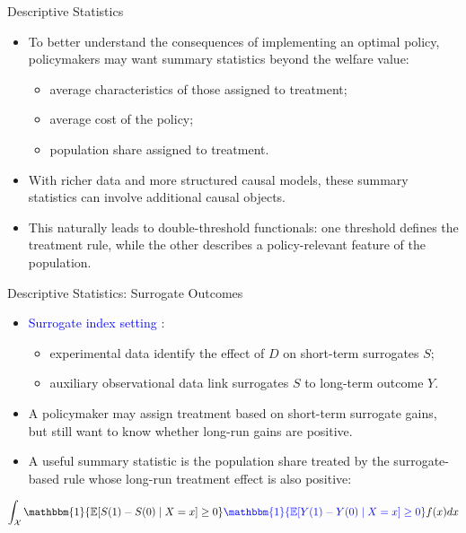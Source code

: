 \documentclass[aspectratio=169,xcolor=dvipsnames]{beamer}
\begin{document}
\begin{frame}{Descriptive Statistics}
    \begin{itemize}
        \item To better understand the consequences of implementing an optimal policy, policymakers may want summary statistics beyond the welfare value:
            \begin{itemize}
                \item[-] average characteristics of those assigned to treatment;
                \item[-] average cost of the policy;
                \item[-] population share assigned to treatment.
            \end{itemize}

        \bigskip
        \item With richer data and more structured causal models, these summary statistics can involve additional causal objects.

        \bigskip
        \item This naturally leads to double-threshold functionals: one threshold defines the treatment rule, while the other describes a policy-relevant feature of the population.
    \end{itemize}
\end{frame}

\begin{frame}{Descriptive Statistics: Surrogate Outcomes}
\bigskip
\centering
{}
\bigskip
\begin{itemize}
    \item \textcolor{blue}{Surrogate index setting} \citep*{AtheyChettyImbensKang2025}:
    \begin{itemize}
        \item[-] experimental data identify the effect of $D$ on short-term surrogates $S$;
        \item[-] auxiliary observational data link surrogates $S$ to long-term outcome $Y$.
    \end{itemize}

    \item A policymaker may assign treatment based on short-term surrogate gains, but still want to know whether long-run gains are positive.

    \item A useful summary statistic is the population share treated by the surrogate-based rule whose long-run treatment effect is also positive:
\end{itemize}

    \[
    \int_\mathcal{X} \mathbbm{1}\{\mathbb{E}[S(1) - S(0) \mid X=x] \geq 0\}\textcolor{blue}{\mathbbm{1}\{\mathbb{E}[Y(1) - Y(0) \mid X=x] \geq 0\}}f(x)dx
    \]
\end{frame}
\end{document}
